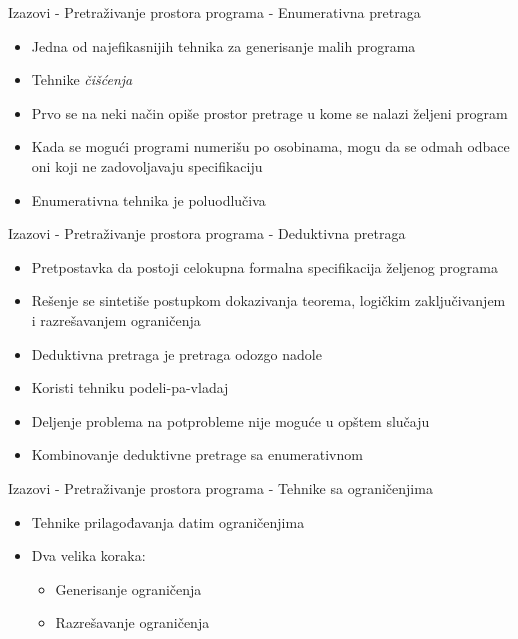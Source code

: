 \begin{frame}{Izazovi - Pretraživanje prostora programa - Enumerativna pretraga}
    \begin{itemize}
        \item Jedna od najefikasnijih tehnika za generisanje malih programa
        \item Tehnike \emph{čišćenja}
        \item Prvo se na neki način opiše prostor pretrage u kome se nalazi željeni program
        \item Kada se mogući programi numerišu po osobinama, mogu da se odmah odbace oni koji ne zadovoljavaju specifikaciju
        \item Enumerativna tehnika je poluodlučiva
    \end{itemize}
\end{frame}

\begin{frame}{Izazovi - Pretraživanje prostora programa - Deduktivna pretraga}
    \begin{itemize}
        \item Pretpostavka da postoji celokupna formalna specifikacija željenog programa
        \item Rešenje se sintetiše postupkom dokazivanja teorema, logičkim zaključivanjem i razrešavanjem ograničenja
        \item Deduktivna pretraga je pretraga odozgo nadole
        \item Koristi tehniku podeli-pa-vladaj
        \item Deljenje problema na potprobleme nije moguće u opštem slučaju
        \item Kombinovanje deduktivne pretrage sa enumerativnom
    \end{itemize}
\end{frame}

\begin{frame}{Izazovi - Pretraživanje prostora programa - Tehnike sa ograničenjima}
    \begin{itemize}
        \item Tehnike prilagođavanja datim ograničenjima
        \item Dva velika koraka:
            \begin{itemize}
                \item Generisanje ograničenja
                \item Razrešavanje ograničenja
            \end{itemize}
    \end{itemize}
\end{frame}


